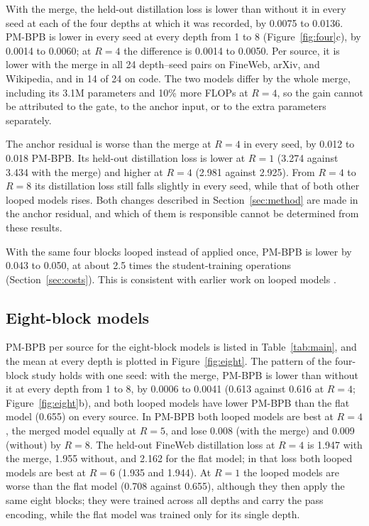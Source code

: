 \documentclass[11pt]{article}
\begin{document}
With the merge, the held-out distillation loss is lower than without it in every seed at each of the four depths at which it was recorded,
by 0.0075 to 0.0136. PM-BPB is lower in every seed at every depth from 1 to 8 (Figure~\ref{fig:four}c), by 0.0014 to 0.0060; at $R = 4$
the difference is 0.0014 to 0.0050. Per source, it is lower with the merge in all 24 depth--seed pairs on FineWeb, arXiv, and Wikipedia, and in
14 of 24 on code. The two models differ by the whole merge, including its 3.1M parameters and 10\% more FLOPs at $R = 4$, so
the gain cannot be attributed to the gate, to the anchor input, or to the extra parameters separately.

The anchor residual is worse than the merge at $R = 4$ in every seed, by 0.012 to 0.018 PM-BPB. Its held-out distillation loss is lower at $R = 1$ (3.274
against 3.434 with the merge) and higher at $R = 4$ (2.981 against 2.925). From $R = 4$ to $R = 8$ its distillation loss still falls slightly in
every seed, while that of both other looped models rises. Both changes described in Section~\ref{sec:method} are made in the anchor residual, and which of them is
responsible cannot be determined from these results.

With the same four blocks looped instead of applied once, PM-BPB is lower by 0.043 to 0.050, at about 2.5 times the student-training operations
(Section~\ref{sec:costs}). This is consistent with earlier work on looped models \citep{lan2020albert,dehghani2019universal}.

\subsection{Eight-block models}
\label{sec:eight}

PM-BPB per source for the eight-block models is listed in Table~\ref{tab:main}, and the mean at every depth is plotted in
Figure~\ref{fig:eight}. The pattern of the four-block study holds with one seed: with the merge, PM-BPB is lower than without it at every depth from 1 to 8,
by 0.0006 to 0.0041 (0.613 against 0.616 at $R = 4$; Figure~\ref{fig:eight}b), and both looped models have
lower PM-BPB than the flat model (0.655) on every source. In PM-BPB both looped models are best at $R = 4$, the merged model equally at $R = 5$, and lose 0.008
(with the merge) and 0.009 (without) by $R = 8$. The held-out FineWeb distillation loss at $R = 4$ is 1.947 with the merge, 1.955 without, and
2.162 for the flat model; in that loss both looped models are best at $R = 6$ (1.935 and 1.944). At $R = 1$ the looped models are worse than the flat model (0.708 against 0.655), although they then apply the same eight
blocks; they were trained across all depths and carry the pass encoding, while the flat model was trained only for its single depth.
\end{document}
